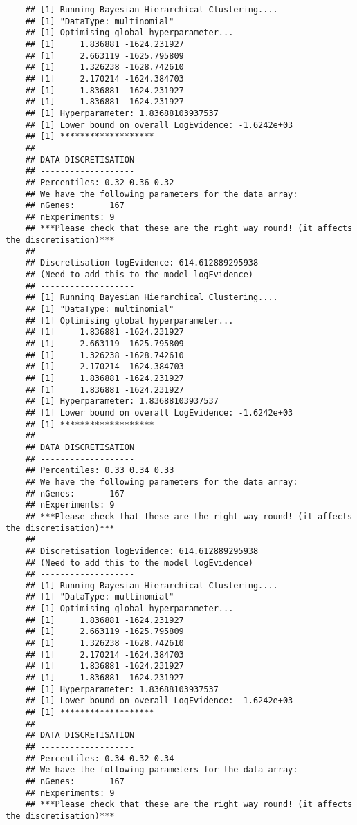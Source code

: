 \begin{verbatim}
    ## [1] Running Bayesian Hierarchical Clustering....
    ## [1] "DataType: multinomial"
    ## [1] Optimising global hyperparameter...
    ## [1]     1.836881 -1624.231927
    ## [1]     2.663119 -1625.795809
    ## [1]     1.326238 -1628.742610
    ## [1]     2.170214 -1624.384703
    ## [1]     1.836881 -1624.231927
    ## [1]     1.836881 -1624.231927
    ## [1] Hyperparameter: 1.83688103937537
    ## [1] Lower bound on overall LogEvidence: -1.6242e+03
    ## [1] *******************
    ## 
    ## DATA DISCRETISATION
    ## -------------------
    ## Percentiles: 0.32 0.36 0.32 
    ## We have the following parameters for the data array:
    ## nGenes:       167
    ## nExperiments: 9
    ## ***Please check that these are the right way round! (it affects the discretisation)***
    ## 
    ## Discretisation logEvidence: 614.612889295938
    ## (Need to add this to the model logEvidence)
    ## -------------------
    ## [1] Running Bayesian Hierarchical Clustering....
    ## [1] "DataType: multinomial"
    ## [1] Optimising global hyperparameter...
    ## [1]     1.836881 -1624.231927
    ## [1]     2.663119 -1625.795809
    ## [1]     1.326238 -1628.742610
    ## [1]     2.170214 -1624.384703
    ## [1]     1.836881 -1624.231927
    ## [1]     1.836881 -1624.231927
    ## [1] Hyperparameter: 1.83688103937537
    ## [1] Lower bound on overall LogEvidence: -1.6242e+03
    ## [1] *******************
    ## 
    ## DATA DISCRETISATION
    ## -------------------
    ## Percentiles: 0.33 0.34 0.33 
    ## We have the following parameters for the data array:
    ## nGenes:       167
    ## nExperiments: 9
    ## ***Please check that these are the right way round! (it affects the discretisation)***
    ## 
    ## Discretisation logEvidence: 614.612889295938
    ## (Need to add this to the model logEvidence)
    ## -------------------
    ## [1] Running Bayesian Hierarchical Clustering....
    ## [1] "DataType: multinomial"
    ## [1] Optimising global hyperparameter...
    ## [1]     1.836881 -1624.231927
    ## [1]     2.663119 -1625.795809
    ## [1]     1.326238 -1628.742610
    ## [1]     2.170214 -1624.384703
    ## [1]     1.836881 -1624.231927
    ## [1]     1.836881 -1624.231927
    ## [1] Hyperparameter: 1.83688103937537
    ## [1] Lower bound on overall LogEvidence: -1.6242e+03
    ## [1] *******************
    ## 
    ## DATA DISCRETISATION
    ## -------------------
    ## Percentiles: 0.34 0.32 0.34 
    ## We have the following parameters for the data array:
    ## nGenes:       167
    ## nExperiments: 9
    ## ***Please check that these are the right way round! (it affects the discretisation)***

\end{verbatim}
